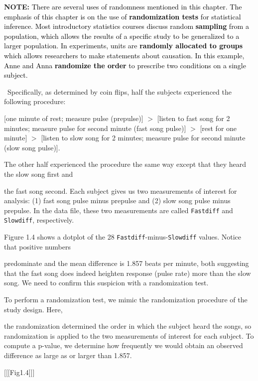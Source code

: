 \documentclass[
]{report}
\theoremstyle{definition}
\theoremstyle{definition}
\theoremstyle{definition}
\theoremstyle{definition}
\theoremstyle{remark}
\begin{document}
\large

\textbf{NOTE:}
\textcolor{black}{There are several uses of randomness mentioned in this chapter. The emphasis of this chapter is on the
use of \textbf{randomization tests} for statistical inference. Most introductory statistics courses discuss random
\textbf{sampling} from a population, which allows the results of a specific study to be generalized to a larger
population. In experiments, units are \textbf{randomly allocated to groups} which allows researchers to make
statements about causation. In this example, Anne and Anna \textbf{randomize the order} to prescribe two
conditions on a single subject.}

\normalsize

~Specifically, as determined by coin flips, half the subjects experienced the following procedure:

{[}one minute of rest; measure pulse (prepulse){]} \(>\) {[}listen to fast song for 2 minutes; measure pulse
for second minute (fast song pulse){]} \(>\) {[}rest for one minute{]} \(>\) {[}listen to slow song for 2 minutes;
measure pulse for second minute (slow song pulse){]}.

The other half experienced the procedure the same way except that they heard the slow song first and

the fast song second.
\textbar{} Each subject gives us two measurements of interest for analysis: (1) fast song pulse minus prepulse
and (2) slow song pulse minus prepulse. In the data file, these two measurements are called \texttt{Fastdiff} and
\texttt{Slowdiff}, respectively.

Figure 1.4 shows a dotplot of the 28 \texttt{Fastdiff}-minus-\texttt{Slowdiff} values. Notice that positive numbers

predominate and the mean difference is 1.857 beats per minute, both suggesting that the fast song does indeed
heighten response (pulse rate) more than the slow song. We need to confirm this suspicion with a randomization
test.

To perform a randomization test, we mimic the randomization procedure of the study design. Here,

the randomization determined the order in which the subject heard the songs, so randomization is applied
to the two measurements of interest for each subject. To compute a p-value, we determine how frequently
we would obtain an observed difference as large as or larger than 1.857.

{[}{[}{[}Fig1.4{]}{]}{]}
\end{document}
